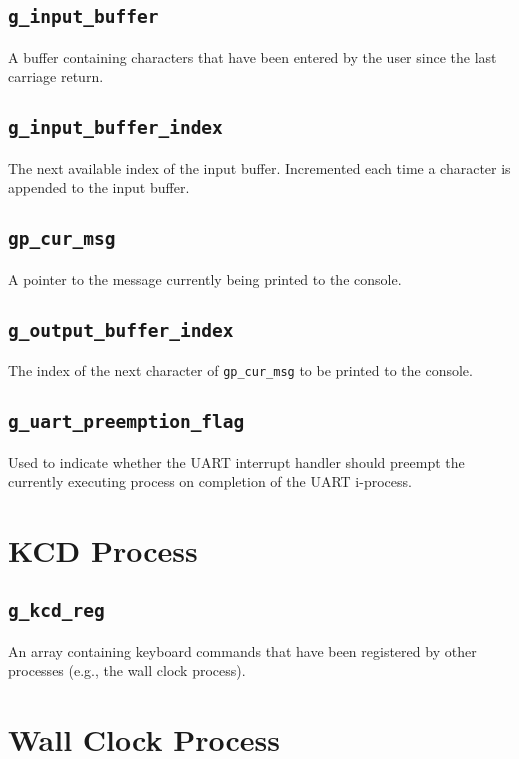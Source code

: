 \documentclass[12pt]{report}
\begin{document}
\subsection{\texttt{g_input_buffer}}

A buffer containing characters that have been entered by the user since the last carriage return.

\subsection{\texttt{g_input_buffer_index}}

The next available index of the input buffer. Incremented each time a character is appended to the input buffer. 

\subsection{\texttt{gp_cur_msg}}

A pointer to the message currently being printed to the console.

\subsection{\texttt{g_output_buffer_index}}

The index of the next character of \texttt{gp_cur_msg} to be printed to the console.

\subsection{\texttt{g_uart_preemption_flag}}

Used to indicate whether the UART interrupt handler should preempt the currently executing process on completion of the UART i-process.

\section{KCD Process}

\subsection{\texttt{g_kcd_reg}}

An array containing keyboard commands that have been registered by other processes (e.g., the wall clock process).

\section{Wall Clock Process}
\end{document}
